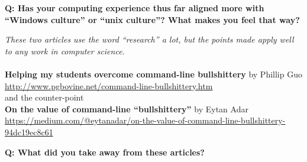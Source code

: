 \documentclass{article}
\begin{document}
\medskip

\textbf{Q: Has your computing experience thus far aligned more with ``Windows
culture'' or ``unix culture''? What makes you feel that way?}

\vspace{7cm}

\noindent
\emph{These two articles use the word ``research'' a lot, but the points made
apply well to any work in computer science.}\\
~\\
\textbf{Helping my students overcome command-line bullshittery} by Phillip Guo\\
\url{http://www.pgbovine.net/command-line-bullshittery.htm}\\
and the counter-point\\
\textbf{On the value of command-line ``bullshittery''} by Eytan Adar\\
\url{https://medium.com/@eytanadar/on-the-value-of-command-line-bullshittery-94dc19ec8c61}\\

\medskip

\textbf{Q: What did you take away from these articles?}
\end{document}
